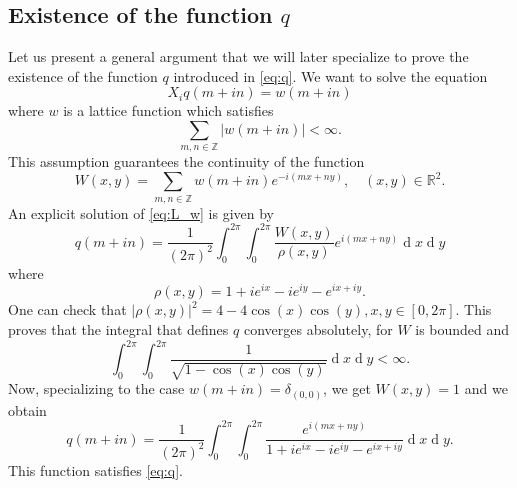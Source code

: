 \documentclass[12pt,a4paper,reqno]{amsart}
\theoremstyle{definition}
\theoremstyle{definition}\newtheorem{defn}[thm]{Definition}
\begin{document}
    
    \subsection{Existence of the function $q$}\label{s:exisrtence_q}
    Let us present a general argument that we will later specialize to prove the existence of the function $q$ introduced in \eqref{eq:q}. We want to solve the equation
    \begin{equation}\label{eq:L_w}
    X_iq(m+in)=w(m+in)
    \end{equation}
    where $w$ is a lattice function which satisfies
    \[
    \sum_{m,n\in\mathbb Z}|w(m+in)|<\infty.
    \]
    This assumption guarantees the continuity of the function
    \[
    W(x,y)=\sum_{m,n\in\mathbb Z} w(m+in)e^{-i(mx+ny)},\quad (x,y)\in\mathbb R^2.
    \]
    An explicit solution of \eqref{eq:L_w} is given by
    \[
    q(m+in)=\frac{1}{(2\pi)^2}\int_{0}^{2\pi}\int_{0}^{2\pi}\frac{W(x,y)}{\rho(x,y)}e^{i(mx+ny)}\operatorname{d}\!x\operatorname{d}\!y
    \]
    where
    \[
    \rho(x,y)=1+ie^{ix}-ie^{iy}-e^{ix+iy}.
    \]
    One can check that $|\rho(x,y)|^2=4-4\cos(x)\cos(y), x,y\in[0,2\pi]$. This proves that the integral that defines $q$ converges absolutely, for $W$ is bounded and
    \[
    \int_{0}^{2\pi}\int_{0}^{2\pi} \frac{1}{\sqrt{1-\cos(x)\cos(y)}}\operatorname{d}\!x\operatorname{d}\!y <\infty.
    \]
    Now, specializing to the case $w(m+in)=\delta_{(0,0)}$, we get $W(x,y)=1$ and  we obtain 
    \begin{equation}\label{eq:q_explicit}
    q(m+in)=\frac{1}{(2\pi)^2}\int_{0}^{2\pi}\int_{0}^{2\pi}\frac{e^{i(mx+ny)}}{1+ie^{ix}-ie^{iy}-e^{ix+iy}}\operatorname{d}\!x\operatorname{d}\!y.    
    \end{equation}
    This function satisfies \eqref{eq:q}.
\end{document}
